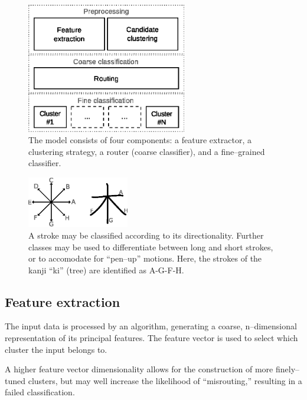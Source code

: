 \documentclass[10pt,conference,a4paper]{IEEEtran}
\begin{document}
	\begin{figure}
		\centering
		\includegraphics[width=2.75in]{./fig/model-overview.eps}
		\caption{The model consists of four components: a feature extractor, a clustering strategy,
			a router (coarse classifier), and a fine--grained classifier.}
		\label{fig_model_overview}
	\end{figure}

	\begin{figure}
		\centering
		\includegraphics[width=1.75in]{./fig/stroke-categories.eps}
		\caption{A stroke may be classified according to its directionality.
			Further classes may be used to differentiate between long and short strokes,
		or to accomodate for ``pen--up'' motions. Here, the strokes of the kanji ``ki'' (tree) are identified as A-G-F-H.}
		\label{fig_stroke_categories}
	\end{figure}






	\subsection{Feature extraction}

	The input data is processed by an algorithm, generating a coarse, n--dimensional representation of its principal features.
	The feature vector is used to select which cluster the input belongs to.
	

	A higher feature vector dimensionality allows for the construction of more finely--tuned clusters, but may well increase
	the likelihood of ``misrouting,'' resulting in a failed classification.
\end{document}
